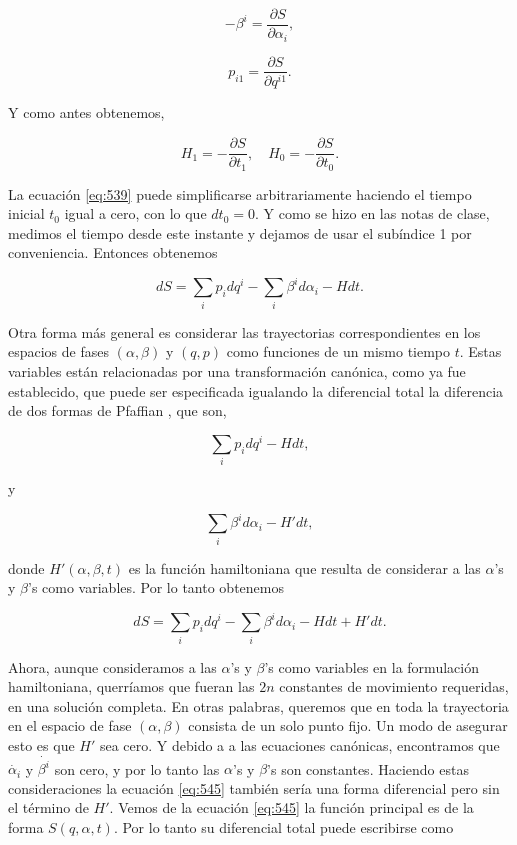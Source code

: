 \documentclass[a4paper,10pt]{article}
\numberwithin{equation}{section}
\begin{document}
\begin{equation}
 - \beta^i = \frac{\partial S}{\partial \alpha_i},
\end{equation}

\begin{equation}
 p_{i1} = \frac{\partial S}{\partial q^{i1}}.
\end{equation}

Y como antes obtenemos, 

\begin{equation}
  H_1 = - \frac{\partial S}{\partial t_1}, \quad 
 H_0 = - \frac{\partial S}{\partial t_0}.
\end{equation}

La ecuación \eqref{eq:539} puede simplificarse arbitrariamente haciendo 
el tiempo inicial $t_0$ igual a cero, con lo que $dt_0 = 0$. Y como 
se hizo en las notas de clase, medimos el tiempo desde este instante y 
dejamos de usar el subíndice 1 por conveniencia. Entonces obtenemos 

\begin{equation}
 dS = \sum_i p_idq^i - \sum_i \beta^i d\alpha_i - Hdt.
 \label{eq:545}
\end{equation}

Otra forma más general es considerar las trayectorias correspondientes 
en los espacios de fases $(\alpha,\beta)$ y $(q,p)$ como funciones de 
un mismo tiempo $t$. Estas variables están relacionadas por una transformación 
canónica, como ya fue establecido, que puede ser especificada igualando 
la diferencial total la diferencia de dos formas de Pfaffian \cite{greenwood}, 
que son,

\begin{equation}
 \sum_i p_idq^i - H dt,
\end{equation}

y 

\begin{equation}
 \sum_i \beta^id\alpha_i - H' dt,
\end{equation}

donde $H'(\alpha,\beta,t)$ es la función hamiltoniana que resulta de 
considerar a las $\alpha$'s y $\beta$'s como variables. Por lo tanto 
obtenemos 

\begin{equation}
 dS = \sum_i p_idq^i - \sum_i \beta^i d\alpha_i - Hdt + H' dt.
\end{equation}

Ahora, aunque consideramos a las $\alpha$'s y $\beta$'s como variables 
en la formulación hamiltoniana, querríamos que fueran las $2n$ constantes 
de movimiento requeridas, en una solución completa. En otras palabras, 
queremos que en toda la trayectoria en el espacio de fase $(\alpha,\beta)$ 
consista de un solo punto fijo. Un modo de asegurar esto es que $H'$ 
sea cero. Y debido a a las ecuaciones canónicas, encontramos que 
$\dot{\alpha_i}$ y $\dot{\beta^i}$ son cero, y por lo tanto las $\alpha$'s
y $\beta$'s son constantes. Haciendo estas consideraciones la ecuación 
\eqref{eq:545} también sería una forma diferencial pero sin el término 
de $H'$. Vemos de la ecuación \eqref{eq:545} la función principal es 
de la forma $S(q,\alpha,t)$. Por lo tanto su diferencial total puede 
escribirse como 
\end{document}
